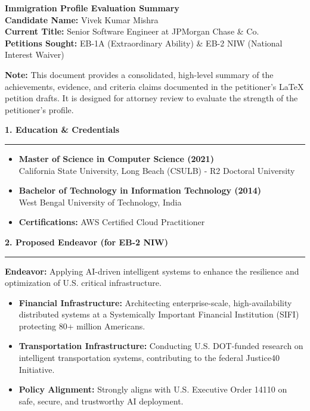 \documentclass[11pt]{article}
\begin{document}
\begin{center}
    {\LARGE \textbf{Immigration Profile Evaluation Summary}} \\[0.5em]
    {\large \textbf{Candidate Name:} Vivek Kumar Mishra} \\
    {\textbf{Current Title:} Senior Software Engineer at JPMorgan Chase \& Co.} \\
    {\textbf{Petitions Sought:} EB-1A (Extraordinary Ability) \& EB-2 NIW (National Interest Waiver)}
\end{center}

\vspace{1em}
\textbf{Note:} This document provides a consolidated, high-level summary of the achievements, evidence, and criteria claims documented in the petitioner's LaTeX petition drafts. It is designed for attorney review to evaluate the strength of the petitioner's profile.

\vspace{1em}
{\Large\bfseries\color{blue!60!black} 1. Education \& Credentials} \hrule\vspace{0.5em}
\begin{itemize}
    \item \textbf{Master of Science in Computer Science (2021)}\\ California State University, Long Beach (CSULB) - R2 Doctoral University
    \item \textbf{Bachelor of Technology in Information Technology (2014)}\\ West Bengal University of Technology, India
    \item \textbf{Certifications:} AWS Certified Cloud Practitioner
\end{itemize}

\vspace{1em}
{\Large\bfseries\color{blue!60!black} 2. Proposed Endeavor (for EB-2 NIW)} \hrule\vspace{0.5em}
\textbf{Endeavor:} Applying AI-driven intelligent systems to enhance the resilience and optimization of U.S. critical infrastructure.
\begin{itemize}
    \item \textbf{Financial Infrastructure:} Architecting enterprise-scale, high-availability distributed systems at a Systemically Important Financial Institution (SIFI) protecting 80+ million Americans.
    \item \textbf{Transportation Infrastructure:} Conducting U.S. DOT-funded research on intelligent transportation systems, contributing to the federal Justice40 Initiative.
    \item \textbf{Policy Alignment:} Strongly aligns with U.S. Executive Order 14110 on safe, secure, and trustworthy AI deployment.
\end{itemize}
\end{document}
